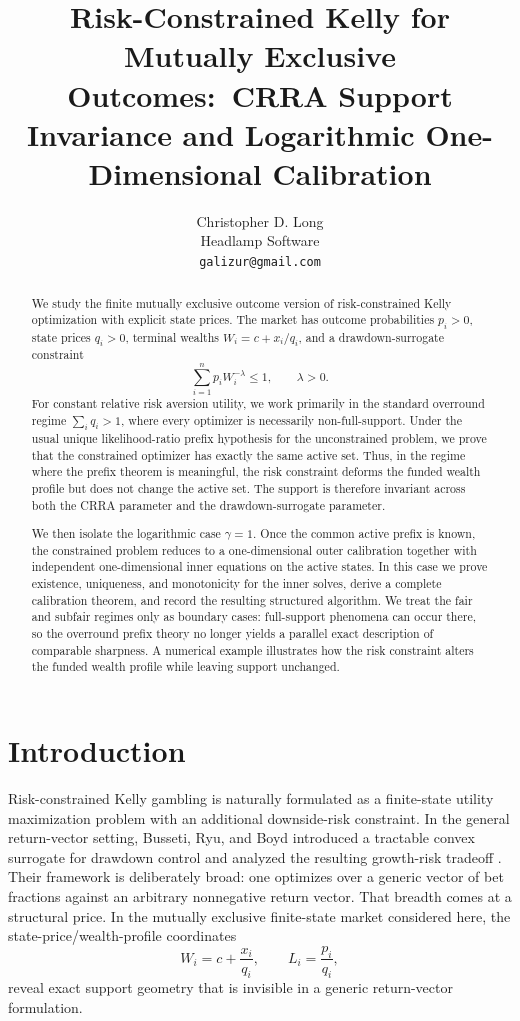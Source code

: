 \documentclass[11pt]{article}
\title{Risk-Constrained Kelly for Mutually Exclusive Outcomes:\
CRRA Support Invariance and Logarithmic One-Dimensional Calibration}
\author{Christopher D. Long\\Headlamp Software\\\texttt{galizur@gmail.com}}
\date{}
\theoremstyle{definition}
\theoremstyle{remark}
\newcommand{\1}{\mathbf{1}}
\begin{document}
\maketitle

\begin{abstract}
We study the finite mutually exclusive outcome version of risk-constrained Kelly optimization with explicit state prices. The market has outcome probabilities $p_i>0$, state prices $q_i>0$, terminal wealths $W_i=c+x_i/q_i$, and a drawdown-surrogate constraint
\[
\sum_{i=1}^n p_i W_i^{-\lambda}\le 1,\qquad \lambda>0.
\]
For constant relative risk aversion utility, we work primarily in the standard overround regime $\sum_i q_i>1$, where every optimizer is necessarily non-full-support. Under the usual unique likelihood-ratio prefix hypothesis for the unconstrained problem, we prove that the constrained optimizer has exactly the same active set. Thus, in the regime where the prefix theorem is meaningful, the risk constraint deforms the funded wealth profile but does not change the active set. The support is therefore invariant across both the CRRA parameter and the drawdown-surrogate parameter.

We then isolate the logarithmic case $\gamma=1$. Once the common active prefix is known, the constrained problem reduces to a one-dimensional outer calibration together with independent one-dimensional inner equations on the active states. In this case we prove existence, uniqueness, and monotonicity for the inner solves, derive a complete calibration theorem, and record the resulting structured algorithm. We treat the fair and subfair regimes only as boundary cases: full-support phenomena can occur there, so the overround prefix theory no longer yields a parallel exact description of comparable sharpness. A numerical example illustrates how the risk constraint alters the funded wealth profile while leaving support unchanged.
\end{abstract}

\section{Introduction}

Risk-constrained Kelly gambling is naturally formulated as a finite-state utility maximization problem with an additional downside-risk constraint. In the general return-vector setting, Busseti, Ryu, and Boyd introduced a tractable convex surrogate for drawdown control and analyzed the resulting growth-risk tradeoff \cite{BussetiRyuBoyd2016}. Their framework is deliberately broad: one optimizes over a generic vector of bet fractions against an arbitrary nonnegative return vector. That breadth comes at a structural price. In the mutually exclusive finite-state market considered here, the state-price/wealth-profile coordinates
\[
W_i=c+\frac{x_i}{q_i},
\qquad
L_i=\frac{p_i}{q_i},
\]
reveal exact support geometry that is invisible in a generic return-vector formulation.
\end{document}
